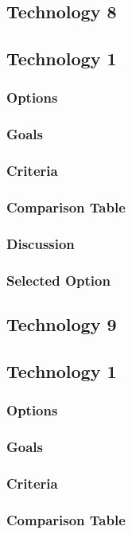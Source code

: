 \documentclass[10pt,draftclsnofoot,onecolumn]{IEEEtran}
\begin{document}
\subsection{Technology 8}
\subsection{Technology 1}
\subsubsection{Options}
\subsubsection{Goals}
\subsubsection{Criteria}
\subsubsection{Comparison Table}
\subsubsection{Discussion}
\subsubsection{Selected Option}
\subsection{Technology 9}
\subsection{Technology 1}
\subsubsection{Options}
\subsubsection{Goals}
\subsubsection{Criteria}
\subsubsection{Comparison Table}
\end{document}
